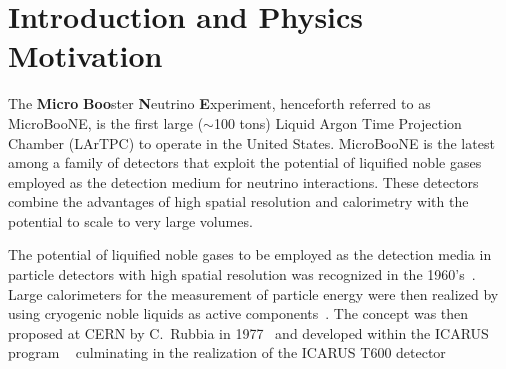 \section{Introduction and Physics Motivation}

The {\bf{Micro}} {\bf{Boo}}ster {\bf{N}}eutrino {\bf{E}}xperiment, henceforth referred to as MicroBooNE, is the first large ($\sim$100 tons) Liquid Argon Time Projection Chamber (LArTPC) to operate in the United States.   MicroBooNE is the latest among a family of detectors that exploit the potential of liquified noble gases employed as the detection medium for neutrino interactions.   These detectors combine the advantages of high spatial resolution and calorimetry with the potential to scale to very large volumes. 

The potential of liquified noble gases to be employed as the detection media in particle detectors with high spatial resolution was recognized in the 1960's~\cite{Doke:1993}. Large calorimeters for the measurement of particle energy were then realized by using cryogenic noble liquids as active components~\cite{Willis:1974}.  The \lartpc concept was then proposed at CERN by C.~Rubbia in 1977~\cite{Rubbia:1977} and developed within the ICARUS program ~\cite{Benetti:1993-3ton,Cennini:1994-3ton,Arneodo:1999-50l} culminating in the realization of the ICARUS T600 detector~\cite{Amerio:2004-T600} 



